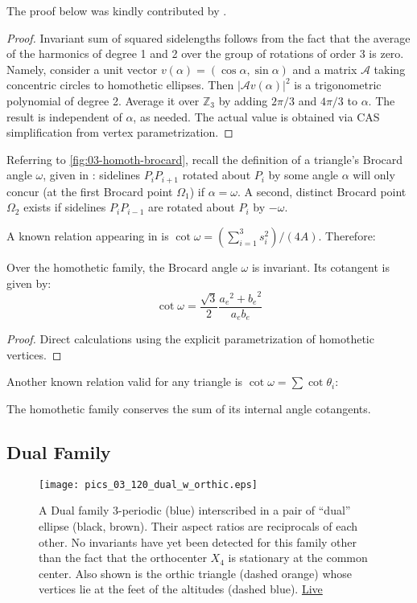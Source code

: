 The proof below was kindly contributed by  \cite{sergei2020-private-sidelengths}.

\begin{proof}
Invariant sum of squared sidelengths follows from the fact that the average of the harmonics of degree 1 and 2 over the group of rotations of order 3 is zero. Namely, consider a unit vector $v(\alpha)=(\cos \alpha, \sin \alpha)$ and a matrix $\mathcal{A}$ taking concentric circles to homothetic ellipses. Then $|\mathcal{A}v(\alpha)|^2$ is a trigonometric polynomial of degree 2. Average it over $\mathbb{Z}_3$ by adding $2\pi/3$ and $4\pi/3$ to $\alpha$. The result is independent of $\alpha$, as needed. The actual value is obtained via CAS simplification from vertex parametrization.
\end{proof}

Referring to \cref{fig:03-homoth-brocard}, recall the definition of a triangle's Brocard angle $\omega$, given in \cite[Brocard Angle]{mw}: sidelines $P_i P_{i+1}$ rotated about $P_i$ by some angle $\alpha$ will only concur (at the first Brocard point $\Omega_1$) if $\alpha=\omega$. A second, distinct Brocard point $\Omega_2$ exists if sidelines $P_i P_{i-1}$ are rotated about $P_{i}$ by $-\omega$.

A known relation appearing in \cite[Brocard Angle, Eqn. 2]{mw} is $\cot\omega=(\sum_{i=1}^3 s_i^2)/(4 A)$. Therefore:

\begin{corollary}
Over the homothetic family, the Brocard angle $\omega$ is invariant. Its cotangent is given by:
\[ \cot\omega=\frac{\sqrt{3}}{2} \frac{{a_e}^{2}+{b_e}^{2}}{a_e b_e} \]	
\end{corollary}

\begin{proof}
Direct calculations using the explicit parametrization of homothetic vertices.
\end{proof}

\noindent Another known relation valid for any triangle is $\cot\omega=\sum\cot\theta_i$:

\begin{corollary}
The homothetic family conserves the sum of its internal angle cotangents.
\end{corollary}

\subsection{Dual Family}

\begin{figure}
    \centering
    \texttt{[image: pics\_03\_120\_dual\_w\_orthic.eps]}
    \caption{A Dual family 3-periodic (blue) interscribed in a pair of ``dual'' ellipse (black, brown). Their aspect ratios are reciprocals of each other. No invariants have yet been detected for this family other than the fact that the orthocenter $X_4$ is stationary at the common center. Also shown is the orthic triangle (dashed orange) whose vertices lie at the feet of the altitudes (dashed blue). \href{https://bit.ly/337wTBS}{Live}}
    \label{fig:03-n3-dual}
\end{figure}

